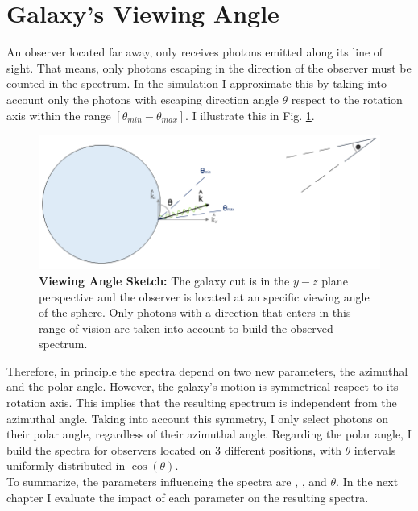 \section{Galaxy's Viewing Angle}
An observer located far away, only receives photons emitted along its line of sight. That means, only photons escaping in the direction of the observer must be counted in the spectrum. In the simulation I approximate this by taking into account only the photons with escaping direction angle $\theta$ respect to the rotation axis within the range $[\theta_{min}-\theta_{max}]$. I illustrate this in Fig. \ref{fig:viewing_angle_sketch}. \\

\begin{figure}[h!]
	\begin{center}
		\includegraphics[width=1\textwidth]{./figures/chapter2/viewing_angle_sketch}
	\end{center}
	\caption{\textbf{Viewing Angle Sketch:} The galaxy cut is in the $y-z$ plane perspective and the observer is located at an specific viewing angle of the sphere. Only photons with a direction that enters in this range of vision are taken into account to build the observed spectrum.
		\label{fig:viewing_angle_sketch}}
\end{figure}

Therefore, in principle the spectra depend on two new parameters, the azimuthal and the polar angle. However, the galaxy's motion is symmetrical respect to its rotation axis. This implies that the resulting spectrum is independent from the azimuthal angle. Taking into account this symmetry, I only select photons on their polar angle, regardless of their azimuthal angle. Regarding the polar angle, I build the spectra for observers located on 3 different positions, with $\theta$ intervals uniformly distributed in $\cos(\theta)$. \\ 

To summarize, the parameters influencing the spectra are \vrot, \vout, \tauh and $\theta$. In the next chapter I evaluate the impact of each parameter on the resulting spectra. \\